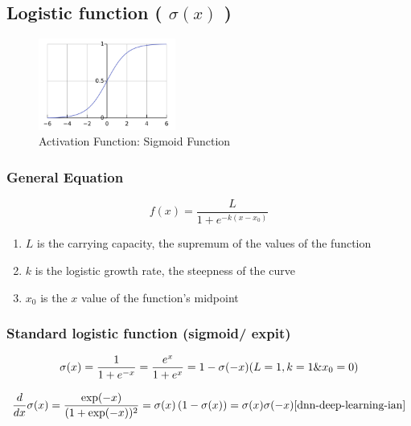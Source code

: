 \subsection{Logistic function ( $\sigma(x)$ ) \cite{wiki-Logistic_function,wiki-Sigmoid_function}}\label{Logistic function}

\begin{figure}[H]
    \centering
    \includegraphics[height=3cm]{Pictures/activation-fns/sigmoid-fn.jpg}
    \caption{Activation Function: Sigmoid Function}
\end{figure}

\subsubsection{General Equation \cite{wiki-Logistic_function,wiki-Sigmoid_function}}
\[
    f(x) = {\dfrac{L}{1 + e^{-k(x - x_{0})}}}
\]


\vspace{0.2cm}

\begin{enumerate}
    \item $L$ is the carrying capacity, the supremum of the values of the function
    \item $k$ is the logistic growth rate, the steepness of the curve
    \item $x_{0}$ is the $x$ value of the function's midpoint
\end{enumerate}


\subsubsection{Standard logistic function (sigmoid/ expit) \cite{wiki-Logistic_function,wiki-Sigmoid_function,dnn-1}}  \label{sigmoid}\label{expit}\label{Standard logistic function}
\[
    \sigma(x) 
    = {\dfrac{1}{1+e^{-x}}} 
    = {\dfrac{e^{x}}{1+e^{x}}} 
    = 1- \sigma(-x)
    \hfill
    (L=1 , k=1 \& x_{0}=0)
\]

\[
    \dfrac{d}{dx} \sigma(x) 
    = \dfrac{\exp(-x)}{(1 + \exp(-x))^2} 
    = \sigma(x)\left(1-\sigma(x)\right)
    = \sigma(x)\sigma(-x)
    \hfill\text{\cite{dnn-deep-learning-ian}}
\]

